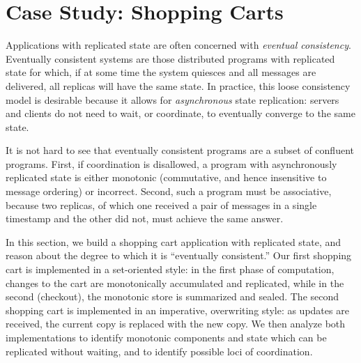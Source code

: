 \section{Case Study: Shopping Carts}
\label{sec:casestudy}
Applications with replicated state are often concerned with {\em eventual
consistency}.  
Eventually consistent systems are those distributed programs with replicated state for which,
if at some time the system quiesces and all 
messages are delivered, all replicas will have the same state.
In practice, this loose consistency model is desirable because it allows for \emph{asynchronous}
state replication: servers and clients do not
need to wait, or coordinate, to eventually converge to the same state.

%

It is not hard to see that eventually consistent programs are a subset of
confluent programs.  First, if coordination is disallowed, 
a program with asynchronously replicated state is either monotonic (commutative, and hence
insensitive to message ordering)
or incorrect.  Second, such a program must be
associative, because two replicas, of which one received a pair of messages in
a single timestamp and the other did not, must achieve the same answer.

In this section, we build a shopping cart application with replicated state,
and reason about the degree to which it is ``eventually consistent.''  Our first 
shopping cart is implemented in a set-oriented style: in the first phase of computation,
changes to the cart are monotonically accumulated and replicated, while in the second
(checkout), the monotonic store is summarized and sealed.  The second shopping cart
is implemented in an imperative, overwriting style: as updates are received, the current copy 
is replaced with the new copy.  We then analyze both implementations to identify monotonic 
components and state which can be replicated without waiting, and to identify possible
loci of coordination.




